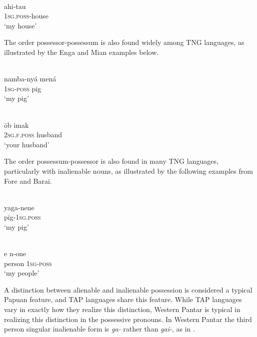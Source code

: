\ea%
\label{ex:4:16}
 \\
\gll  ahi-tau \\
 \textsc{1sg.poss}-house  \\
\glt `my house'
\z





The order possessor-possessum is also found widely among TNG languages, as illustrated by the Enga and Mian examples below.

\ea%
\label{ex:4:17}
 \\
\gll  namba-ny\'a men\'a \\
 \textsc{1sg-poss} pig  \\
\glt `my pig'
\z





\ea%
\label{ex:4:18}
 \\
\gll  \=ob imak \\
   \textsc{2sg.f.poss} husband\\
\glt `your husband'
\z





The order possessum-possessor is also found in many TNG languages, particularly with inalienable nouns, as illustrated by the following examples from Fore and Barai.


\ea%
\label{ex:4:19}
 \\
\gll  yaga-nene \\
   pig-\textsc{1sg.poss} \\
\glt `my pig'
\z





\ea%
\label{ex:4:20}
 \\
\gll  e n-one \\
   person \textsc{1sg-poss} \\
\glt `my people'
\z





A distinction between alienable and inalienable possession is considered a typical Papuan feature, and TAP languages share this feature. While TAP languages vary in exactly how they realize this distinction, Western Pantar is typical in realizing this distinction in the possessive pronouns. In Western Pantar the third person singular inalienable form is \textit{ga-} rather than \textit{gai-}, as in .

